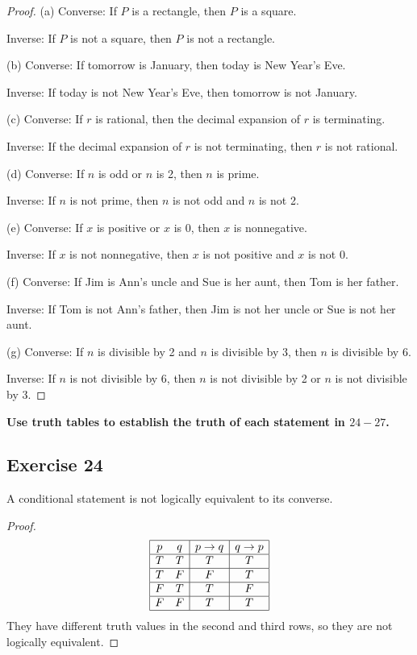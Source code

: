 \documentclass[14pt]{extarticle}
\begin{document}
\begin{proof}
(a) Converse: If $P$ is a rectangle, then $P$ is a square.

Inverse: If $P$ is not a square, then $P$ is not a rectangle.

(b) Converse: If tomorrow is January, then today is New Year’s Eve.

Inverse: If today is not New Year’s Eve, then tomorrow is not January.

(c) Converse: If $r$ is rational, then the decimal expansion of $r$ is terminating.

Inverse: If the decimal expansion of $r$ is not terminating, then $r$ is not rational.

(d) Converse: If $n$ is odd or $n$ is 2, then $n$ is prime.

Inverse: If $n$ is not prime, then $n$ is not odd and $n$ is not 2.

(e) Converse: If $x$ is positive or $x$ is 0, then $x$ is nonnegative.

Inverse: If $x$ is not nonnegative, then $x$ is not positive and $x$ is not 0.

(f) Converse: If Jim is Ann’s uncle and Sue is her aunt, then Tom is her father.

Inverse: If Tom is not Ann’s father, then Jim is not her uncle or Sue is not her aunt.

(g) Converse: If $n$ is divisible by 2 and $n$ is divisible by 3, then $n$ is divisible by 6.

Inverse: If $n$ is not divisible by 6, then $n$ is not divisible by 2 or $n$ is not divisible by 3.
\end{proof}

{\bf Use truth tables to establish the truth of each statement in $24-27$.}

\subsection{Exercise 24}
A conditional statement is not logically equivalent to its converse.

\begin{proof}
$$
\begin{array}{|cc|c|c|}
\hline
p & q & p \to q & q \to p \\
\hline
T & T & T & T \\
\hline
T & F & F & T \\
\hline
F & T & T & F \\
\hline
F & F & T & T \\
\hline
\end{array}
$$
They have different truth values in the second and third rows, so they are not logically equivalent.
\end{proof}
\end{document}
